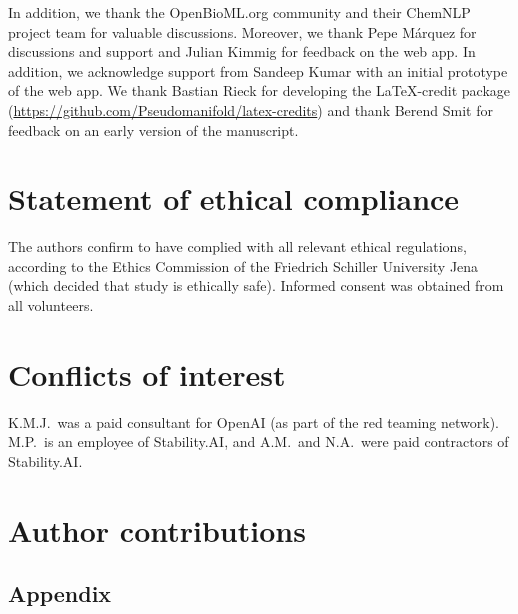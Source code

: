 \documentclass[11pt, oneside]{article}
\begin{document}
\begin{refsection}
In addition, we thank the OpenBioML.org community and their ChemNLP project team for valuable discussions.
Moreover, we thank Pepe Márquez for discussions and support and Julian Kimmig for feedback on the web app.
In addition, we acknowledge support from Sandeep Kumar with an initial prototype of the web app.
We thank Bastian Rieck for developing the \LaTeX-credit package (\url{https://github.com/Pseudomanifold/latex-credits}) and thank Berend Smit for feedback on an early version of the manuscript.

\section*{Statement of ethical compliance}
The authors confirm to have complied with all relevant ethical regulations, according to the Ethics Commission of the Friedrich Schiller University Jena (which decided that study is ethically safe). Informed consent was obtained from all volunteers.


\section*{Conflicts of interest}
K.M.J.\ was a paid consultant for OpenAI (as part of the red teaming network). M.P.\ is an employee of Stability.AI, and A.M.\ and N.A.\ were paid contractors of Stability.AI.

\section*{Author contributions}

\resizebox{\textwidth}{!}{%
\scriptsize
\insertcredits
}
\normalsize
\printbibliography
\end{refsection}

\clearpage
\begin{refsection}
\renewcommand{\thefigure}{A\arabic{figure}}
\setcounter{figure}{0}

\renewcommand{\thetable}{A\arabic{table}}
\setcounter{table}{0}

\appendix
\section{Appendix}

\clearpage
\printbibliography[heading=subbibintoc]
\end{refsection}
\end{document}
